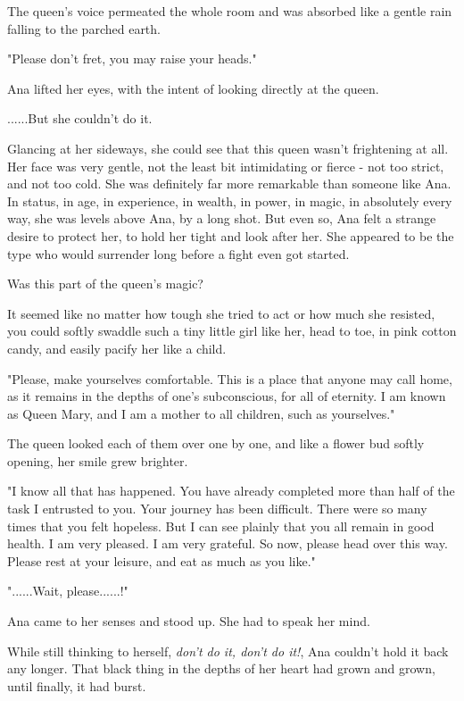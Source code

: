 \documentclass[
]{article}
\begin{document}
The queen's voice permeated the whole room and was absorbed like a
gentle rain falling to the parched earth.

"Please don't fret, you may raise your heads."

Ana lifted her eyes, with the intent of looking directly at the queen.

......But she couldn't do it.

Glancing at her sideways, she could see that this queen wasn't
frightening at all. Her face was very gentle, not the least bit
intimidating or fierce - not too strict, and not too cold. She was
definitely far more remarkable than someone like Ana. In status, in age,
in experience, in wealth, in power, in magic, in absolutely every way,
she was levels above Ana, by a long shot. But even so, Ana felt a
strange desire to protect her, to hold her tight and look after her. She
appeared to be the type who would surrender long before a fight even got
started.

Was this part of the queen's magic?

It seemed like no matter how tough she tried to act or how much she
resisted, you could softly swaddle such a tiny little girl like her,
head to toe, in pink cotton candy, and easily pacify her like a child.

"Please, make yourselves comfortable. This is a place that anyone may
call home, as it remains in the depths of one's subconscious, for all of
eternity. I am known as Queen Mary, and I am a mother to all children,
such as yourselves."

The queen looked each of them over one by one, and like a flower bud
softly opening, her smile grew brighter.

"I know all that has happened. You have already completed more than half
of the task I entrusted to you. Your journey has been difficult. There
were so many times that you felt hopeless. But I can see plainly that
you all remain in good health. I am very pleased. I am very grateful. So
now, please head over this way. Please rest at your leisure, and eat as
much as you like."

"......Wait, please......!"

Ana came to her senses and stood up. She had to speak her mind.

While still thinking to herself, \emph{don't do it, don't do it!}, Ana
couldn't hold it back any longer. That black thing in the depths of her
heart had grown and grown, until finally, it had burst.
\end{document}
